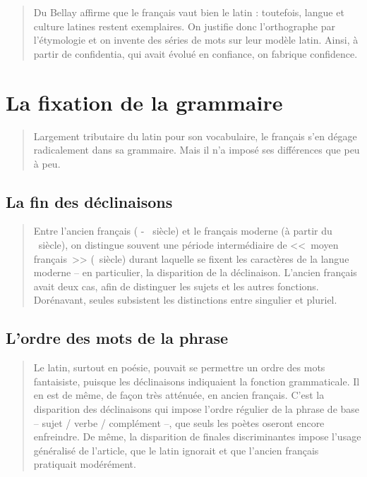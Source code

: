 \begin{quotation}
  Du Bellay affirme que le français vaut bien le latin : toutefois,
  langue et culture latines restent exemplaires. On justifie donc
  l'orthographe par l'étymologie et on invente des séries de mots sur
  leur modèle latin. Ainsi, à partir de confidentia, qui avait évolué
  en confiance, on fabrique confidence.
\end{quotation}

\section{La fixation de la grammaire}\label{sec:fixgram}

\begin{quote}
  Largement tributaire du latin pour son vocabulaire, le français s'en
  dégage radicalement dans sa grammaire. Mais il n'a imposé ses
  différences que peu à peu.
\end{quote}

\subsection{La fin des déclinaisons}\label{subsec:findec}

\begin{quotation}
  Entre l'ancien français (\textsc{} -
\textsc{}~siècle) et le français moderne (à
partir du \textsc{}~siècle), on distingue
souvent une période intermédiaire de <<~moyen français~>>
(\textsc{}~siècle) durant laquelle se fixent les
caractères de la langue moderne -- en particulier, la disparition de
la déclinaison. L'ancien français avait deux cas, afin de distinguer
les sujets et les autres fonctions.
Dorénavant, seules subsistent les distinctions entre singulier et pluriel.
\end{quotation}

\subsection{L'ordre des mots de la phrase}\label{subsec:ordmot}

\begin{quotation}
  Le latin, surtout en poésie, pouvait se permettre un ordre des mots
  fantaisiste, puisque les déclinaisons indiquaient la fonction
  grammaticale. Il en est de même, de façon très atténuée, en ancien
  français. C'est la disparition des déclinaisons qui impose l'ordre
  régulier de la phrase de base -- sujet / verbe / complément --, que
  seuls les poètes oseront encore enfreindre. De même, la disparition
  de finales discriminantes impose l'usage généralisé de l'article,
  que le latin ignorait et que l'ancien français pratiquait modérément.
\end{quotation}

